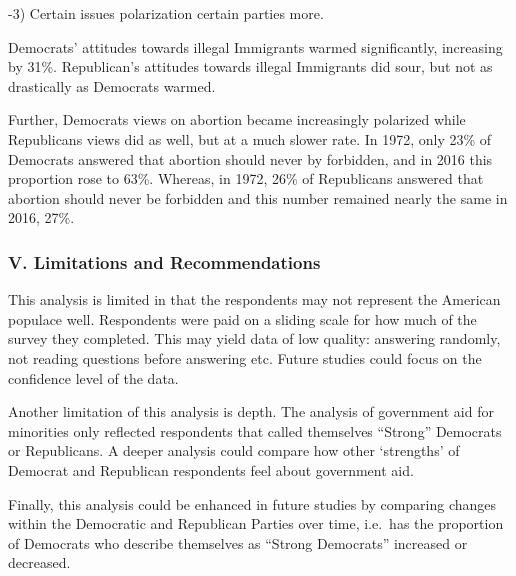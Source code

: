 \documentclass[
]{article}
\begin{document}
-3) Certain issues polarization certain parties more.

Democrats' attitudes towards illegal Immigrants warmed significantly,
increasing by 31\%. Republican's attitudes towards illegal Immigrants
did sour, but not as drastically as Democrats warmed.

Further, Democrats views on abortion became increasingly polarized while
Republicans views did as well, but at a much slower rate. In 1972, only
23\% of Democrats answered that abortion should never by forbidden, and
in 2016 this proportion rose to 63\%. Whereas, in 1972, 26\% of
Republicans answered that abortion should never be forbidden and this
number remained nearly the same in 2016, 27\%.

\hypertarget{v.-limitations-and-recommendations}{%
\subsubsection{\texorpdfstring{\textbf{V. Limitations and
Recommendations
}}{V. Limitations and Recommendations }}\label{v.-limitations-and-recommendations}}

This analysis is limited in that the respondents may not represent the
American populace well. Respondents were paid on a sliding scale for how
much of the survey they completed. This may yield data of low quality:
answering randomly, not reading questions before answering etc. Future
studies could focus on the confidence level of the data.

Another limitation of this analysis is depth. The analysis of government
aid for minorities only reflected respondents that called themselves
``Strong'' Democrats or Republicans. A deeper analysis could compare how
other `strengths' of Democrat and Republican respondents feel about
government aid.

Finally, this analysis could be enhanced in future studies by comparing
changes within the Democratic and Republican Parties over time, i.e.~has
the proportion of Democrats who describe themselves as ``Strong
Democrats'' increased or decreased.
\end{document}
